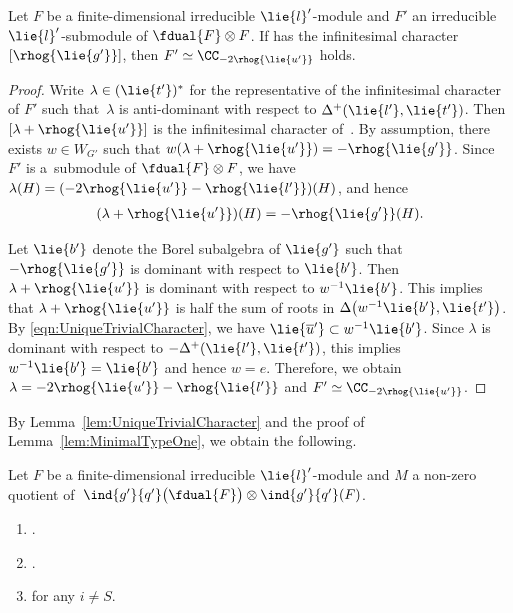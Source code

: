 \begin{Lemma}\label{lem:UniqueTrivialCharacter}
	Let $F$ be a finite-dimensional irreducible $\lie{l}'$-module and $F'$ an irreducible $\lie{l}'$-submodule of $\fdual{F}\otimes F$.
	If  has the infinitesimal character $[\rhog{\lie{g'}}]$, then $F' \simeq \CC_{-2\rhog{\lie{u'}}}$ holds.
\end{Lemma}

\begin{proof}
	Write $\lambda\in (\lie{t'})^*$ for the representative of the infinitesimal character of $F'$ such that~$\lambda$ is anti-dominant with respect to $\Delta^+(\lie{l'}, \lie{t'})$.
	Then $[\lambda + \rhog{\lie{u'}}]$ is the infinitesimal character of~.
	By assumption, there exists $w \in W_{G'}$ such that $w(\lambda + \rhog{\lie{u'}}) = -\rhog{\lie{g'}}$.
	Since~$F'$ is a~submodule of $\fdual{F}\otimes F$, we have $\lambda(H) = (-2\rhog{\lie{u'}} - \rhog{\lie{l'}})(H)$, and hence
	\begin{align}
		(\lambda + \rhog{\lie{u'}})(H) = -\rhog{\lie{g'}}(H). \label{eqn:UniqueTrivialCharacter}
	\end{align}

	Let $\lie{b'}$ denote the Borel subalgebra of $\lie{g'}$ such that $-\rhog{\lie{g'}}$ is dominant with respect to $\lie{b'}$.
	Then $\lambda + \rhog{\lie{u'}}$ is dominant with respect to $w^{-1}\lie{b'}$.
	This implies that $\lambda + \rhog{\lie{u'}}$ is half the sum of roots in $\Delta\bigl(w^{-1}\lie{b'}, \lie{t'}\bigr)$.
	By \eqref{eqn:UniqueTrivialCharacter}, we have $\lie{\overline{u}'} \subset w^{-1}\lie{b'}$.
	Since $\lambda$ is dominant with respect to $-\Delta^+(\lie{l'}, \lie{t'})$, this implies $w^{-1}\lie{b'} = \lie{b'}$
	and hence $w = e$.
	Therefore, we obtain $\lambda = -2\rhog{\lie{u'}} - \rhog{\lie{l'}}$ and $F'\simeq \CC_{-2\rhog{\lie{u'}}}$.
\end{proof}

By Lemma~\ref{lem:UniqueTrivialCharacter} and the proof of Lemma~\ref{lem:MinimalTypeOne}, we obtain the following.

\begin{Lemma}\label{lem:ExistenceInvariantVector}
	Let $F$ be a finite-dimensional irreducible $\lie{l}'$-module and $M$ a non-zero quotient of~${\ind{g'}{q'}\bigl(\fdual{F}\bigr)\otimes \ind{g'}{q'}(F)}$.
	\begin{enumerate}\itemsep=0pt
		\item[$1.$] .
		\item[$2.$] .
		\item[$3.$]  for any $i \neq S$.
	\end{enumerate}
\end{Lemma}

